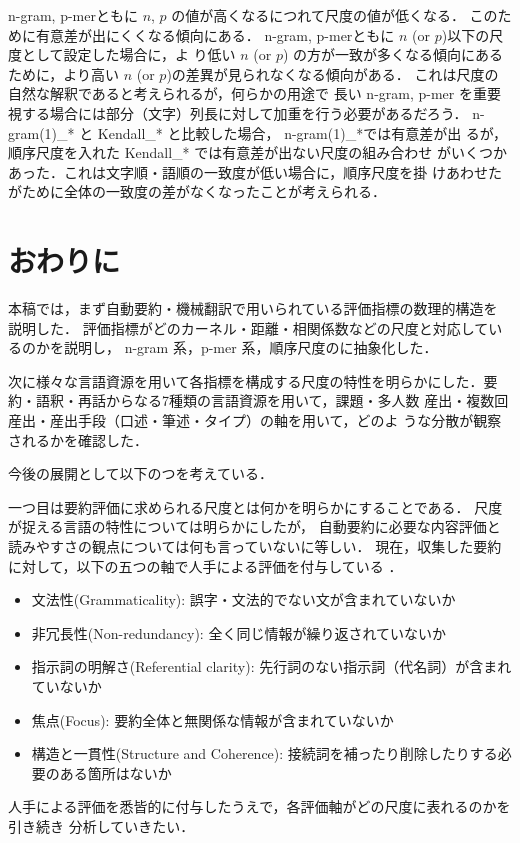 \documentclass[japanese]{jnlp_1.4}
\newcommand{\modified}[1]{}
\begin{document}
n-gram, p-merともに $n$, $p$ の値が高くなるにつれて尺度の値が低くなる．
このために有意差が出にくくなる傾向にある．
n-gram, p-merともに $n$ (or $p$)以下の尺度として設定した場合に，よ
り低い $n$ (or $p$) の方が一致が多くなる傾向にあるために，より高い
$n$ (or $p$)の差異が見られなくなる傾向がある．
これは尺度の自然な解釈であると考えられるが，何らかの用途で
長い n-gram, p-mer を重要視する場合には部分（文字）列長に対して加重を行う必要があるだろう．
n-gram(1)\_* と Kendall\_* と比較した場合， n-gram(1)\_*では有意差が出
るが，順序尺度を入れた Kendall\_* では有意差が出ない尺度の組み合わせ
がいくつかあった．これは文字順・語順の一致度が低い場合に，順序尺度を掛
けあわせたがために全体の一致度の差がなくなったことが考えられる．
 

\section{おわりに}  

本稿では，まず自動要約・機械翻訳で用いられている評価指標の数理的構造を
説明した．
評価指標がどのカーネル・距離・相関係数などの尺度と対応しているのかを説明し，
n-gram 系，p-mer 系，\modified{ベクトル型順序尺度，編集型}順序尺度の\modified{四つ}に抽象化した．

次に様々な言語資源を用いて各指標を構成する尺度の特性を明らかにした．要約・語釈・再話からなる7種類の言語資源を用いて，課題・多人数
産出・複数回産出・産出手段（口述・筆述・タイプ）の軸を用いて，どのよ
うな分散が観察されるかを確認した．
\modified{結果，各評価尺度において，表現一致と内容一致の識別は困難であり，評価の識別限界としての分散があることを示した．}

今後の展開として以下の\modified{五}つを考えている．

一つ目は要約評価に求められる尺度とは何かを明らかにすることである．
尺度が捉える言語の特性については明らかにしたが，
自動要約に必要な内容評価と読みやすさの観点については何も言っていないに等しい．
現在，収集した要約に対して，以下の五つの軸で人手による評価を付与している
\cite{asahara-2015-jclws7}．
\begin{itemize}
 \item 文法性(Grammaticality): 誤字・文法的でない文が含まれていないか
 \item 非冗長性(Non-redundancy): 全く同じ情報が繰り返されていないか
 \item 指示詞の明解さ(Referential clarity): 先行詞のない指示詞（代名詞）が含まれ
       ていないか
 \item 焦点(Focus): 要約全体と無関係な情報が含まれていないか
 \item 構造と一貫性(Structure and Coherence): 接続詞を補ったり削除したりする必要のある箇所はないか
\end{itemize}
人手による評価を悉皆的に付与したうえで，各評価軸がどの尺度に表れるのかを引き続き
分析していきたい．
\end{document}
